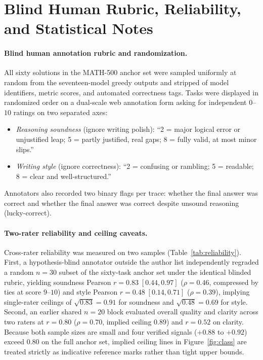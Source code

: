 \section{Blind Human Rubric, Reliability, and Statistical Notes}
\label{app:rubric}

\paragraph{Blind human annotation rubric and randomization.}
All sixty solutions in the \textsc{MATH-500} anchor set were sampled uniformly at random from the seventeen-model greedy outputs and stripped of model identifiers, metric scores, and automated correctness tags.
Tasks were displayed in randomized order on a dual-scale web annotation form asking for independent $0$--$10$ ratings on two separated axes:
\begin{itemize}
\item \emph{Reasoning soundness} (ignore writing polish): ``2 = major logical error or unjustified leap; 5 = partly justified, real gaps; 8 = fully valid, at most minor slips.''
\item \emph{Writing style} (ignore correctness): ``2 = confusing or rambling; 5 = readable; 8 = clear and well-structured.''
\end{itemize}
Annotators also recorded two binary flags per trace: whether the final answer was correct and whether the final answer was correct despite unsound reasoning (lucky-correct).

\paragraph{Two-rater reliability and ceiling caveats.}
Cross-rater reliability was measured on two samples (Table~\ref{tab:reliability}).
First, a hypothesis-blind annotator outside the author list independently regraded a random $n{=}30$ subset of the sixty-task anchor set under the identical blinded rubric, yielding soundness Pearson $r = 0.83 \; [0.44, 0.97]$ ($\rho = 0.46$, compressed by ties at score $9$--$10$) and style Pearson $r = 0.48 \; [0.14, 0.71]$ ($\rho = 0.39$), implying single-rater ceilings of $\sqrt{0.83} = 0.91$ for soundness and $\sqrt{0.48} = 0.69$ for style.
Second, an earlier shared $n{=}20$ block evaluated overall quality and clarity across two raters at $r = 0.80$ ($\rho = 0.70$, implied ceiling $0.89$) and $r = 0.52$ on clarity.
Because both sample sizes are small and four verified signals ($+0.88$ to $+0.92$) exceed $0.80$ on the full anchor set, implied ceiling lines in Figure~\ref{fig:class} are treated strictly as indicative reference marks rather than tight upper bounds.


